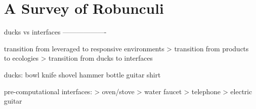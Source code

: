 \chapter{A Survey of Robunculi}
\label{ch:survey}
%
ducks vs interfaces
-------------------

transition from leveraged to responsive environments
> transition from products to ecologies
> transition from ducks to interfaces

ducks:
bowl
knife
shovel
hammer
bottle
guitar
shirt

pre-computational interfaces:
> oven/stove
> water faucet
> telephone
> electric guitar

